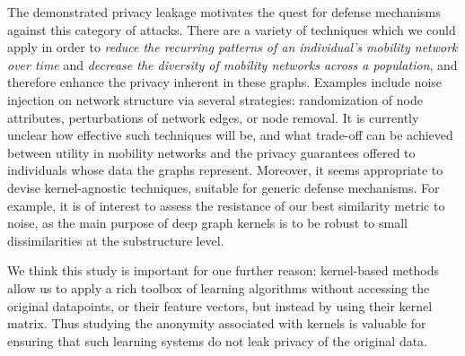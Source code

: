 The demonstrated privacy leakage motivates the quest
for defense mechanisms against this category of attacks.
There are a variety of techniques which we could apply in order to \emph{reduce the recurring patterns of an individual's mobility network over time} and \emph{decrease the diversity of mobility networks across a population}, and therefore enhance the privacy inherent in these graphs.
Examples include noise injection on network structure via several strategies: randomization of node attributes, perturbations of network edges, or node removal.
It is currently unclear how effective such techniques will be, and what trade-off can be achieved between utility in mobility networks and the privacy guarantees offered to individuals whose data the graphs represent.
Moreover, it seems appropriate to devise kernel-agnostic techniques, suitable for generic defense mechanisms.
For example, it is of interest to assess the resistance of our best similarity metric to noise, as the main purpose of deep graph kernels is to be robust to small dissimilarities at the substructure level.

We think this study is important for one further reason: kernel-based methods allow us to apply a rich toolbox
of learning algorithms without accessing the original datapoints, or their feature vectors, but instead by using their kernel matrix.
Thus studying the anonymity associated with kernels is valuable for ensuring that such learning systems do not leak privacy of the original data.

